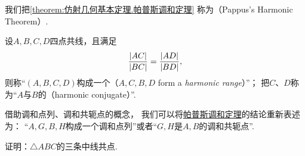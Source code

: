 我们把\cref{theorem:仿射几何基本定理.帕普斯调和定理}
称为（Pappus's Harmonic Theorem）.

\begin{definition}
设\(A,B,C,D\)四点共线，且满足\begin{equation*}
	\frac{\abs{AC}}{\abs{BC}}
	= \frac{\abs{AD}}{\abs{BD}},
\end{equation*}
则称“\((A,B,C,D)\)构成一个（\(A,C,B,D\) form a \emph{harmonic range}）”；
把\(C\)、\(D\)称为“\(A\)与\(B\)的（harmonic conjugate）”.
\end{definition}

借助调和点列、调和共轭点的概念，
我们可以将\hyperref[theorem:仿射几何基本定理.帕普斯调和定理]{帕普斯调和定理}的结论重新表述为：
“\(A,G,\allowbreak B,H\)构成一个调和点列”或者“\(G,H\)是\(A,B\)的调和共轭点”.

\begin{example}
证明：\(\triangle ABC\)的三条中线共点.
\end{example}
